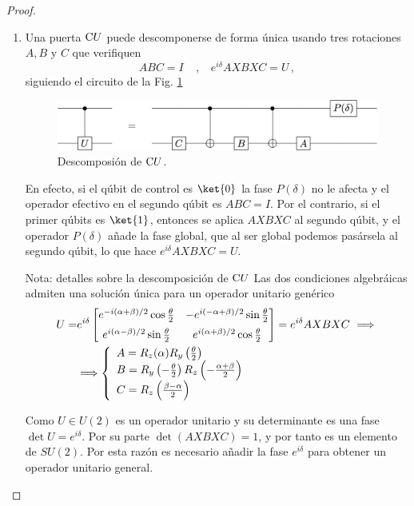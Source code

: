 \documentclass[a4paper,11pt]{book} %
\numberwithin{equation}{chapter}
\newcommand{\cg}[1]{{\rm C}#1}
\begin{document}
\begin{proof}
\begin{enumerate}
		\item Una puerta $\cg{U}$ puede descomponerse de forma única usando tres rotaciones $A, B$ y $C$ que verifiquen
		\begin{equation}
		ABC = I ~~~~~,~~~~ e^{i\delta}  AXBXC = U\, ,
		\end{equation}
		siguiendo el circuito de la Fig. \ref{Fig_universal_CUdecomposition}
			\begin{figure}[H]
			\centering 
			\includegraphics[width=0.65\linewidth]{Figuras/Fig_universal_CUdecomposition}
			\caption{Descomposión de $\cg{U}$.}
			\label{Fig_universal_CUdecomposition}
			\end{figure}
		En efecto, si el qúbit de control es $\ket{0}$ la fase $P(\delta)$ no le afecta y el operador efectivo en el segundo 
		qúbit es $ABC= I$. Por el contrario, si el primer qúbits es $\ket{1}$, entonces se aplica $AXBXC$ al segundo qúbit, y 
		el operador $P(\delta)$ añade la fase global, que al ser global podemos pasársela al segundo qúbit, lo que hace 
		$e^{i\delta} AXBXC = U$.
		
		\begin{mybox_blue}{Nota: detalles sobre la descomposición de $\cg {U}$}
		Las dos condiciones  algebráicas admiten una solución única para un operador unitario genérico  
		\begin{align*}
		U = & e^{i\delta} 
		\begin{bmatrix} 
     		e^{-i(\alpha+\beta)/2} \cos\frac{\theta}{2}  &  - e^{i(-\alpha+\beta)/2}\sin\frac{\theta}{2}  \\  \rule{0mm}{5mm}
	    	e^{i(\alpha-\beta)/2}\sin\frac{\theta}{2}    &  e^{i(\alpha+\beta)/2}\cos\frac{\theta}{2}
		\end{bmatrix} 
		= e^{i\delta} AXBXC ~  \Longrightarrow ~ \\ \vspace{5mm}
		& \Longrightarrow 	
		\left\{ \begin{array}{l} 
			A = R_z(\alpha) R_y\left(\frac{\theta}{2}\right) \\ 
			B = R_y\left(-\frac{\theta}{2}\right) R_z\left(-\frac{\alpha + \beta}{2}\right) \\
			C = R_z\left( \frac{\beta-\alpha}{2}\right)
		\end{array} \right.
		\end{align*}				

		Como $U\in U(2)$  es un operador unitario y  su determinante es una fase $\det U = e^{i\delta}$. Por su parte 
		$\det(AXBXC) = 1$, y por tanto es un elemento de $SU(2)$.  Por esta razón es necesario añadir la fase $e^{i\delta}$ 
		para obtener un operador unitario general. 
		\end{mybox_blue}		
		
	\end{enumerate}
	\end{proof}
\end{document}
